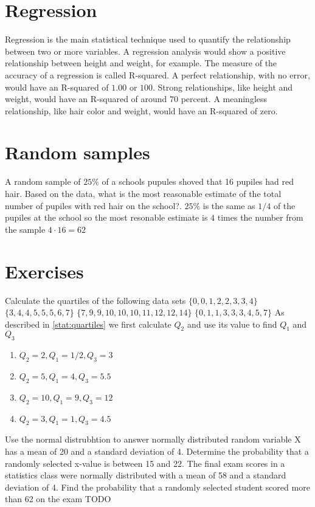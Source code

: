 \section{Regression}
Regression is the main statistical technique used to quantify the relationship between two or more variables. A regression analysis would show a positive relationship between height and weight, for example. The measure of the accuracy of a regression is called R-squared. A perfect relationship, with no error, would have an R-squared of $1.00$ or $100$. Strong relationships, like height and weight, would have an R-squared of around $70$ percent. A meaningless relationship, like hair color and weight, would have an R-squared of zero.

\section{Random samples}
A random sample of $25\%$ of a schools pupules shoved that 16 pupiles had red hair. Based on the data, what is the most reasonable estimate of the total number of pupiles with red hair on the school?. $25\%$ is the same as $1/4$ of the pupiles at the school so the most resonable estimate is $4$ times the number from the sample $4 \cdot 16 = 62$

\section{Exercises}
\begin{ExerciseList}


\Exercise Calculate the quartiles of the following data sets
\Question $\{0, 0, 1, 2, 2, 3, 3, 4\}$
\Question $\{3, 4, 4, 5, 5, 5, 6, 7\}$
\Question $\{7, 9, 9, 10, 10, 10, 11, 12, 12, 14\}$
\Question $\{0, 1, 1, 3, 3, 3, 4, 5, 7\}$
\Answer As described in \ref{stat:quartiles} we first calculate $Q_2$ and use its value to find $Q_1$ and $Q_3$
\begin{enumerate}
\item \myindent $Q_2 = 2, Q_1 = 1/2, Q_3 = 3$
\item \myindent $Q_2 = 5, Q_1 = 4, Q_3 = 5.5$
\item \myindent $Q_2 = 10, Q_1 = 9, Q_3 = 12$
\item \myindent $Q_2 = 3, Q_1 = 1, Q_3 = 4.5$
\end{enumerate}

\Exercise Use the normal distrubhtion to answer
\Question normally distributed random variable X has a mean of 20 and a standard deviation of 4. Determine the probability that a randomly selected x-value is between 15 and 22.
\Question The final exam scores in a statistics class were normally distributed with a mean of 58 and a standard deviation of 4. Find the probability that a randomly selected student scored more than 62 on the exam
\Answer TODO

\end{ExerciseList}
